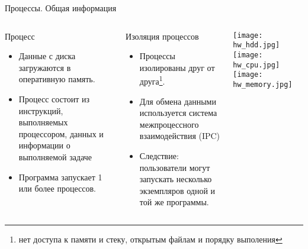 \begin{frame}{Процессы. Общая информация}
\begin{columns}
  \begin{block}{Процесс}
    \begin{itemize}
      \item Данные с диска загружаются в оперативную память.
      \item Процесс состоит из инструкций, выполняемых процессором, данных и информации о выполняемой задаче 
      \item Программа запускает 1 или более процессов. 
    \end{itemize} 
  \end{block}
  \begin{block}{Изоляция процессов}
    \begin{itemize}
      \item Процессы изолированы друг от друга\footnote{нет доступа к памяти и стеку, открытым файлам и порядку выполения}.
      \item Для обмена данными используется система межпроцессного взаимодействия (IPC)
      \item Следствие: пользователи могут запускать несколько экземпляров одной и той же программы. 
    \end{itemize}
  \end{block}
        \texttt{[image: hw\_hdd.jpg]} \break
        \texttt{[image: hw\_cpu.jpg]} \break
        \texttt{[image: hw\_memory.jpg]} 
\end{columns}
\end{frame}


